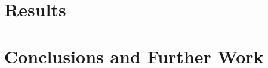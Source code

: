 \documentclass[twoside,leqno,twocolumn]{article}
\begin{document}
\vspace{-1em}
\section{\label{sec:results} Results}


\vspace{-1em}
\section{\label{sec:conclusions} Conclusions and Further Work}

\vspace{-1em}










\end{document}
